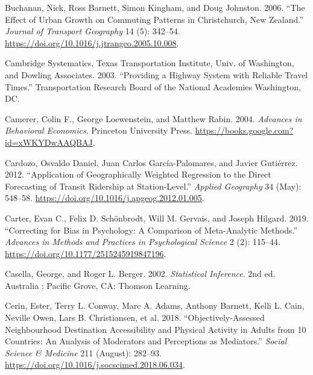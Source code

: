 \documentclass[
  11pt,
  openany]{memoir}
\newlength{\cslhangindent}
\newlength{\cslentryspacingunit} %
\newenvironment{CSLReferences}[2] %
 {%
  \setlength{\parindent}{0pt}
  \ifodd #1
  \let\oldpar\par
  \def\par{\hangindent=\cslhangindent\oldpar}
  \fi
  \setlength{\parskip}{#2\cslentryspacingunit}
 }%
 {}
\begin{document}
\begin{CSLReferences}{1}{0}
\leavevmode{}%
Buchanan, Nick, Ross Barnett, Simon Kingham, and Doug Johnston. 2006. {``The Effect of Urban Growth on Commuting Patterns in {Christchurch}, {New Zealand}.''} \emph{Journal of Transport Geography} 14 (5): 342--54. \url{https://doi.org/10.1016/j.jtrangeo.2005.10.008}.

\leavevmode{}%
Cambridge Systematics, Texas Transportation Institute, Univ. of Washington, and Dowling Associates. 2003. {``Providing a Highway System with Reliable Travel Times.''} Transportation Research Board of the National Academies Washington, DC.

\leavevmode{}%
Camerer, Colin F., George Loewenstein, and Matthew Rabin. 2004. \emph{Advances in {Behavioral Economics}}. {Princeton University Press}. \url{https://books.google.com?id=xWKYDwAAQBAJ}.

\leavevmode{}%
Cardozo, Osvaldo Daniel, Juan Carlos García-Palomares, and Javier Gutiérrez. 2012. {``Application of Geographically Weighted Regression to the Direct Forecasting of Transit Ridership at Station-Level.''} \emph{Applied Geography} 34 (May): 548--58. \url{https://doi.org/10.1016/j.apgeog.2012.01.005}.

\leavevmode{}%
Carter, Evan C., Felix D. Schönbrodt, Will M. Gervais, and Joseph Hilgard. 2019. {``Correcting for {Bias} in {Psychology}: A {Comparison} of {Meta}-{Analytic Methods}.''} \emph{Advances in Methods and Practices in Psychological Science} 2 (2): 115--44. \url{https://doi.org/10.1177/2515245919847196}.

\leavevmode{}%
Casella, George, and Roger L. Berger. 2002. \emph{Statistical Inference}. 2nd ed. {Australia ; Pacific Grove, CA}: {Thomson Learning}.

\leavevmode{}%
Cerin, Ester, Terry L. Conway, Marc A. Adams, Anthony Barnett, Kelli L. Cain, Neville Owen, Lars B. Christiansen, et al. 2018. {``Objectively-Assessed Neighbourhood Destination Accessibility and Physical Activity in Adults from 10 Countries: An Analysis of Moderators and Perceptions as Mediators.''} \emph{Social Science \& Medicine} 211 (August): 282--93. \url{https://doi.org/10.1016/j.socscimed.2018.06.034}.


\end{CSLReferences}
\end{document}
